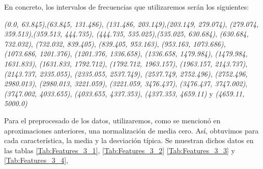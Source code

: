 \documentclass[12pt]{article}
\begin{document}
En concreto, los intervalos de frecuencias que utilizaremos serán los siguientes:

\textit{(0.0, 63.845)},\textit{(63.845, 131.486)}, 
\textit{(131.486, 203.149)},\textit{(203.149, 279.074)}, 
\textit{(279.074, 359.513)},\textit{(359.513, 444.735)}, 
\textit{(444.735, 535.025)},\textit{(535.025, 630.684)}, 
\textit{(630.684, 732.032)}, \textit{(732.032, 839.405)},
\textit{(839.405, 953.163)}, \textit{(953.163, 1073.686)},
\textit{(1073.686, 1201.376)}, \textit{(1201.376, 1336.658)}, 
\textit{(1336.658, 1479.984)}, \textit{(1479.984, 1631.833)},
\textit{(1631.833, 1792.712)}, \textit{(1792.712, 1963.157)},
\textit{(1963.157, 2143.737)}, \textit{(2143.737, 2335.055)}, 
\textit{(2335.055, 2537.749)}, \textit{(2537.749, 2752.496)}, 
\textit{(2752.496, 2980.013)}, \textit{(2980.013, 3221.059)}, 
\textit{(3221.059, 3476.437)}, \textit{(3476.437, 3747.002)},
\textit{(3747.002, 4033.655)}, \textit{(4033.655, 4337.353)},
\textit{(4337.353, 4659.11)} y \textit{(4659.11, 5000.0)}



Para el preprocesado de los datos, utilizaremos, como se mencionó en aproximaciones anteriores,
una normalización de media cero.
Así, obtuvimos para cada característica, la media y la desviación típica. Se muestran dichos datos en las tablas \ref{Tab:Features_3_1},
\ref{Tab:Features_3_2} \ref{Tab:Features_3_3} y \ref{Tab:Features_3_4},

\bigskip
\end{document}
